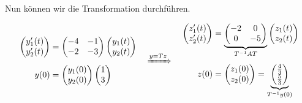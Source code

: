 Nun können wir die Transformation durchführen. 

\begin{equation*}
        \begin{aligned}
            \begin{pmatrix}
                y_1'(t) \\
                y_2'(t)
            \end{pmatrix} &=
            \begin{pmatrix}
                -4 & -1 \\
                -2 & -3
            \end{pmatrix}
            \begin{pmatrix}
                y_1(t) \\
                y_2(t)
            \end{pmatrix} \\[0.5em]
            y(0)&= \begin{pmatrix}
                y_1(0) \\
                y_2(0)
            \end{pmatrix}
            \begin{pmatrix}
                1 \\
                3
            \end{pmatrix} 
        \end{aligned} \quad \xRightarrow{y = Tz} \quad
        \begin{aligned}
            \begin{pmatrix}
                z_1'(t) \\
                z_2'(t)
            \end{pmatrix} &=
            \underbrace{\begin{pmatrix}
                -2 & 0 \\
                0 & -5
            \end{pmatrix}}_{T^{-1} A T}
            \begin{pmatrix}
                z_1(t) \\
                z_2(t)
            \end{pmatrix} \\[0.5em]
            z(0)&= \begin{pmatrix}
                z_1(0) \\
                z_2(0)
            \end{pmatrix} =
            \underbrace{\begin{pmatrix}
                \frac{4}{3} \\
                \frac{5}{3}
            \end{pmatrix}}_{T^{-1} y(0)}
        \end{aligned}
\end{equation*}

